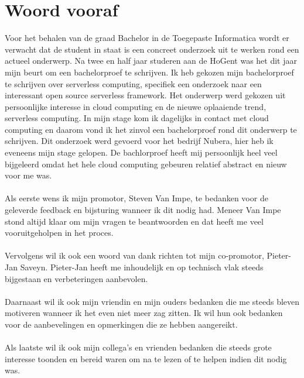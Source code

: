 
\chapter*{Woord vooraf}
\label{ch:voorwoord}

Voor het behalen van de graad Bachelor in de Toegepaste Informatica wordt er verwacht dat de student in staat is een concreet onderzoek uit te werken rond een actueel onderwerp. Na twee en half jaar studeren aan de HoGent was het dit jaar mijn beurt om een bachelorproef te schrijven. Ik heb gekozen mijn bachelorproef te schrijven over serverless computing, specifiek een onderzoek naar een interessant open source serverless framework. Het onderwerp werd gekozen uit persoonlijke interesse in cloud computing en de nieuwe oplaaiende trend, serverless computing. In mijn stage kom ik dagelijks in contact met cloud computing en daarom vond ik het zinvol een bachelorproef rond dit onderwerp te schrijven. Dit onderzoek werd gevoerd voor het bedrijf Nubera, hier heb ik eveneens mijn stage gelopen. De bachlorproef heeft mij persoonlijk heel veel bijgeleerd omdat het hele cloud computing gebeuren relatief abstract en nieuw voor me was. 
\\\\
Als eerste wens ik mijn promotor, Steven Van Impe, te bedanken voor de geleverde feedback en bijsturing wanneer ik dit nodig had. Meneer Van Impe stond altijd klaar om mijn vragen te beantwoorden en dat heeft me veel vooruitgeholpen in het proces.
\\\\
Vervolgens wil ik ook een woord van dank richten tot mijn co-promotor, Pieter-Jan Saveyn. Pieter-Jan heeft me inhoudelijk en op technisch vlak steeds bijgestaan en verbeteringen aanbevolen.
\\\\
Daarnaast wil ik ook mijn vriendin en mijn ouders bedanken die me steeds bleven motiveren wanneer ik het even niet meer zag zitten. Ik wil hun ook bedanken voor de aanbevelingen en opmerkingen die ze hebben aangereikt.
\\\\
Als laatste wil ik ook mijn collega's en vrienden bedanken die steeds grote interesse toonden en bereid waren om na te lezen of te helpen indien dit nodig was.
